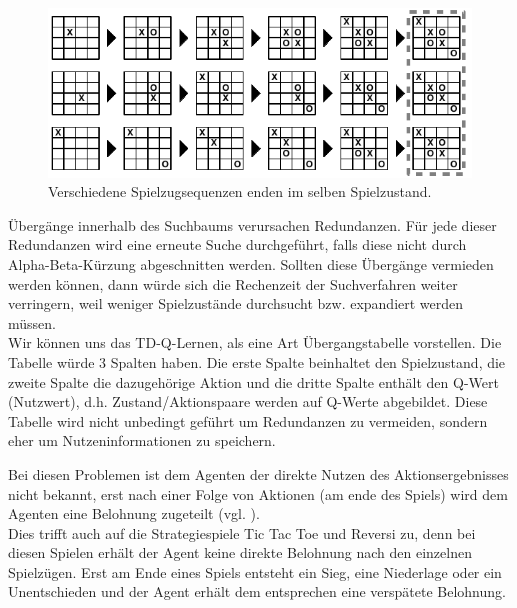 \begin{figure}[!htbp]
  \centering
  \includegraphics{inhalt/abbildungen/transitionen_tictactoe.pdf}
  \caption{Verschiedene Spielzugsequenzen enden im selben Spielzustand.}
  \label{fig:transitionen_tictactoe}
\end{figure} 

Übergänge innerhalb des Suchbaums verursachen Redundanzen. Für jede dieser Redundanzen wird eine erneute Suche durchgeführt, falls diese nicht durch Alpha-Beta-Kürzung abgeschnitten werden. Sollten diese Übergänge vermieden werden können, dann würde sich die Rechenzeit der Suchverfahren weiter verringern, weil weniger Spielzustände durchsucht bzw. expandiert werden müssen. \\

Wir können uns das TD-Q-Lernen, als eine Art Übergangstabelle vorstellen. Die Tabelle würde 3 Spalten haben. Die erste Spalte beinhaltet den Spielzustand, die zweite Spalte die dazugehörige Aktion und die dritte Spalte enthält den Q-Wert (Nutzwert), d.h. Zustand/Aktionspaare werden auf Q-Werte abgebildet. Diese Tabelle wird nicht unbedingt geführt um Redundanzen zu vermeiden, sondern eher um Nutzeninformationen zu speichern.

















Bei diesen Problemen ist dem Agenten der direkte Nutzen des Aktionsergebnisses nicht bekannt, erst nach einer Folge von Aktionen (am ende des Spiels) wird dem Agenten eine Belohnung zugeteilt (vgl. \cite[397]{Alpaydin}). \\

Dies trifft auch auf die Strategiespiele Tic Tac Toe und Reversi zu, denn bei diesen Spielen erhält der Agent keine direkte Belohnung nach den einzelnen Spielzügen. Erst am Ende eines Spiels entsteht ein Sieg, eine Niederlage oder ein Unentschieden und der Agent erhält dem entsprechen eine verspätete Belohnung. \\ 






















